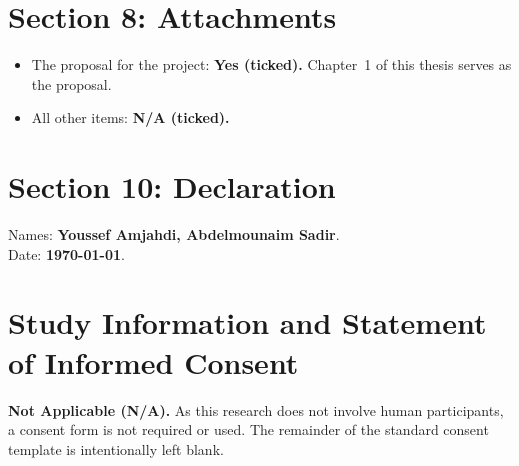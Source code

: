\section*{Section 8: Attachments}
\begin{itemize}
  \item The proposal for the project: \textbf{Yes (ticked).} Chapter~1 of this thesis serves as the proposal.
  \item All other items: \textbf{N/A (ticked).}
\end{itemize}

\section*{Section 10: Declaration}
Names: \textbf{Youssef Amjahdi, Abdelmounaim Sadir}. \\
Date: \textbf{\today}.

\section*{Study Information and Statement of Informed Consent}
\textbf{Not Applicable (N/A).} As this research does not involve human participants, a consent form is not required or used. The remainder of the standard consent template is intentionally left blank.
